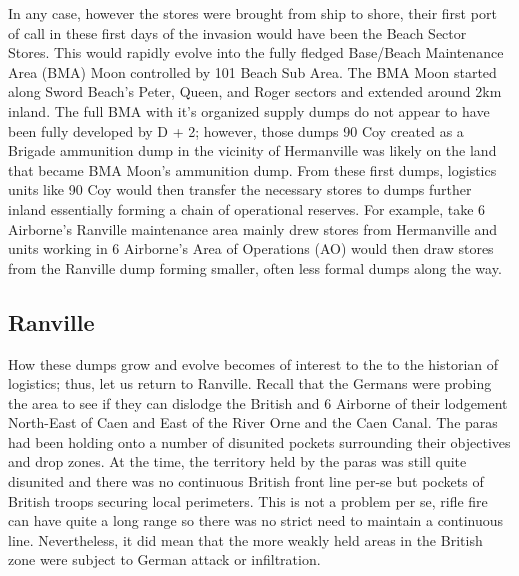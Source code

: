 \documentclass[noraggedright]{turabian-researchpaper}
\begin{document}
In any case, however the stores were brought from ship to shore, their first
port of call in these first days of the invasion would have been the Beach 
Sector Stores.  This would rapidly evolve into the fully fledged Base/Beach
Maintenance Area (BMA) Moon controlled by 101 Beach Sub Area.\autocite[See
traces in Neptune No. 1 RAF Beach Squadron Operation Order found in][]
{1raf}  The BMA Moon started along Sword Beach's Peter, Queen, and Roger
sectors and extended around 2km inland.  The full BMA with it's organized
supply dumps do not appear to have been fully developed by D + 2; however,
those dumps 90 Coy created as a Brigade ammunition dump in the vicinity of
Hermanville was likely on the land that became BMA Moon's ammunition 
dump.\autocite[Trace of BMA Moon
annexed to Neptune RAF Beach Squadron Operation Order found in]
[Legend entry 67]{1raf}   From these first dumps, logistics units like 90 Coy
would then transfer the necessary stores to dumps further inland essentially
forming a chain of operational reserves.  For example, take 6 Airborne's 
Ranville maintenance area mainly drew stores from Hermanville and units 
working in 6 Airborne's Area of Operations (AO) would then draw stores from
the Ranville dump forming smaller, often less formal dumps along the way.

\subsection{Ranville}





How these dumps grow and evolve becomes of interest to the to the historian
of logistics; thus, let us return to Ranville.  Recall that the Germans were
probing the area to see if they can dislodge the British and 6 Airborne of 
their lodgement North-East of Caen and East of the River Orne
and the Caen Canal. The paras had been holding onto a number of disunited
pockets surrounding their objectives and drop zones.  At the time, the 
territory held by the paras was still quite disunited and there was no
continuous British front line per-se but pockets of British troops securing
local perimeters.  This is not a problem per se, rifle fire can have quite a
long range so there was no strict need to maintain a continuous line.  
Nevertheless, it did mean that the more weakly held areas in the British 
zone were subject to German attack or infiltration.  
\end{document}
